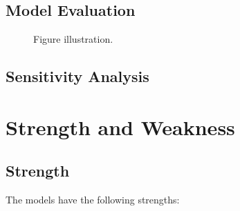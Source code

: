 \documentclass[12pt,a4paper]{article}
\begin{document}
\begin{spacing}{1.2}
\subsection{Model Evaluation}


\begin{figure}[H]
\caption{Figure illustration.}
\label{Figure_Flyer}
\end{figure}



\subsection{Sensitivity Analysis}


\section{Strength and Weakness}
\label{Strength_Weakness}


\subsection{Strength}

The models have the following strengths:


\end{spacing}
\end{document}
